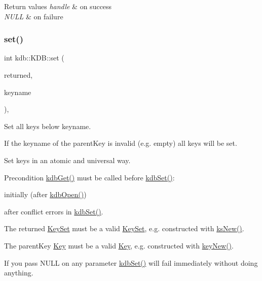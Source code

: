 \begin{DoxyRetVals}{Return values}
{\em handle} & on success \\
\hline
{\em N\+U\+LL} & on failure \\
\hline
\end{DoxyRetVals}
\mbox{\label{classkdb_1_1KDB_a29087a6a1a7de334f4e5b62ffe5d6e6e}} 
\subsubsection{\texorpdfstring{set()}{set()}\hspace{0.1cm}{\footnotesize\ttfamily [1/2]}}
{\footnotesize\ttfamily int kdb\+::\+K\+D\+B\+::set (\begin{DoxyParamCaption}\item[{\mbox{\hyperlink{classkdb_1_1KeySet}{Key\+Set}} \&}]{returned,  }\item[{std\+::string const \&}]{keyname }\end{DoxyParamCaption})\hspace{0.3cm}{\ttfamily [inline]}, {\ttfamily [virtual]}}



Set all keys below keyname. 

If the keyname of the parent\+Key is invalid (e.\+g. empty) all keys will be set.

Set keys in an atomic and universal way. \begin{DoxyPrecond}{Precondition}
\mbox{\hyperlink{group__kdb_ga28e385fd9cb7ccfe0b2f1ed2f62453a1}{kdb\+Get()}} must be called before \mbox{\hyperlink{group__kdb_ga11436b058408f83d303ca5e996832bcf}{kdb\+Set()}}\+:
\begin{DoxyItemize}
\item initially (after \mbox{\hyperlink{group__kdb_ga6808defe5870f328dd17910aacbdc6ca}{kdb\+Open()}})
\item after conflict errors in \mbox{\hyperlink{group__kdb_ga11436b058408f83d303ca5e996832bcf}{kdb\+Set()}}.
\end{DoxyItemize}

The {\ttfamily returned} \mbox{\hyperlink{classkdb_1_1KeySet}{Key\+Set}} must be a valid \mbox{\hyperlink{classkdb_1_1KeySet}{Key\+Set}}, e.\+g. constructed with \mbox{\hyperlink{group__keyset_ga671e1aaee3ae9dc13b4834a4ddbd2c3c}{ks\+New()}}.

The {\ttfamily parent\+Key} \mbox{\hyperlink{classkdb_1_1Key}{Key}} must be a valid \mbox{\hyperlink{classkdb_1_1Key}{Key}}, e.\+g. constructed with \mbox{\hyperlink{group__key_gad23c65b44bf48d773759e1f9a4d43b89}{key\+New()}}.
\end{DoxyPrecond}
If you pass N\+U\+LL on any parameter \mbox{\hyperlink{group__kdb_ga11436b058408f83d303ca5e996832bcf}{kdb\+Set()}} will fail immediately without doing anything.

